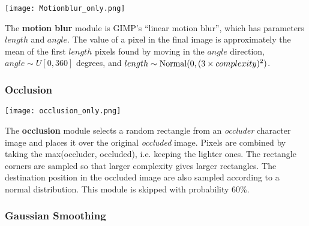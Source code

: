 \documentclass[smallcondensed]{svjour3}     %
\begin{document}
\begin{minipage}[t]{0.14\linewidth}
\centering
\vspace*{0mm}
\texttt{[image: Motionblur\_only.png]}
\end{minipage}%
\hspace{0.3cm}\begin{minipage}[t]{0.83\linewidth}
\vspace*{2mm}
The {\bf motion blur} module is GIMP's ``linear motion blur'', which
has parameters $length$ and $angle$. The value of
a pixel in the final image is approximately the  mean of the first $length$ pixels
found by moving in the $angle$ direction,
$angle \sim U[0,360]$ degrees, and $length \sim {\rm Normal}(0,(3 \times complexity)^2)$.
\end{minipage}


\subsubsection*{Occlusion}

\begin{minipage}[t]{0.14\linewidth}
\centering
\vspace*{3mm}
\texttt{[image: occlusion\_only.png]}\\
\end{minipage}%
\hspace{0.3cm}\begin{minipage}[t]{0.83\linewidth}
The {\bf occlusion} module selects a random rectangle from an {\em occluder} character
image and places it over the original {\em occluded}
image. Pixels are combined by taking the max(occluder, occluded),
i.e. keeping the lighter ones.
The rectangle corners
are sampled so that larger complexity gives larger rectangles.
The destination position in the occluded image are also sampled
according to a normal distribution.
This module is skipped with probability 60\%.
\end{minipage}

\subsubsection*{Gaussian Smoothing}
\end{document}

